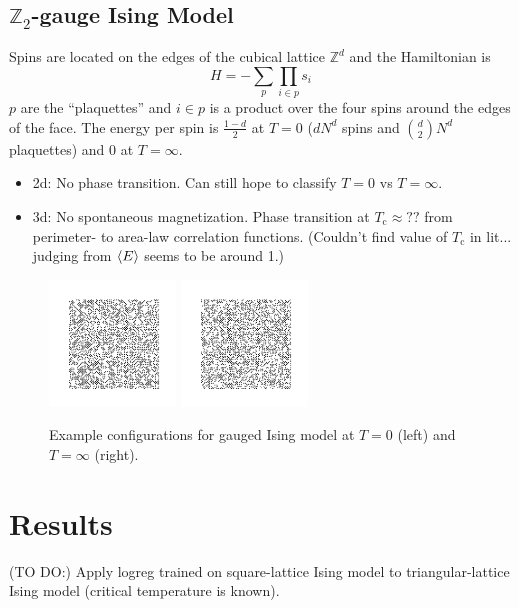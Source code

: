 \documentclass[11pt]{article}
\begin{document}
\subsection{$\mathbb{Z}_2$-gauge Ising Model}
Spins are located on the edges of the cubical lattice $\mathbb{Z}^d$ and the Hamiltonian is
\begin{equation}
    H = -\sum_p\prod_{i\in p}s_i
\end{equation}
$p$ are the ``plaquettes'' and $i\in p$ is a product over the four spins around the edges of the face. The energy per spin is $\frac{1-d}{2}$ at $T=0$ ($dN^d$ spins and $\binom{d}{2}N^d$ plaquettes) and 0 at $T=\infty$.
\begin{itemize}
    \item 2d: No phase transition. Can still hope to classify $T=0$ vs $T=\infty$.
    \item 3d: No spontaneous magnetization. Phase transition at $T_\text{c}\approx??$ from perimeter- to area-law correlation functions. (Couldn't find value of $T_\text{c}$ in lit... judging from $\ev{E}$ seems to be around 1.)
\end{itemize}
\begin{figure}[h]
    \centering
    \includegraphics[width=0.3\textwidth]{gauged_T=0.png}
    \includegraphics[width=0.3\textwidth]{gauged_T=inf.png}
    \caption{Example configurations for gauged Ising model at $T=0$ (left) and $T=\infty$ (right).}
\end{figure}


\section{Results}
(TO DO:) Apply logreg trained on square-lattice Ising model to triangular-lattice Ising model (critical temperature is known).
\end{document}
